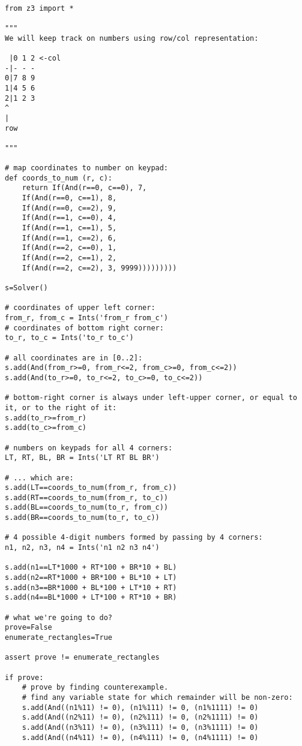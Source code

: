 \begin{lstlisting}[style=custompy]

from z3 import *

"""
We will keep track on numbers using row/col representation:

 |0 1 2 <-col
-|- - -
0|7 8 9
1|4 5 6
2|1 2 3
^
|
row

"""

# map coordinates to number on keypad:
def coords_to_num (r, c):
    return If(And(r==0, c==0), 7,
    If(And(r==0, c==1), 8,
    If(And(r==0, c==2), 9,
    If(And(r==1, c==0), 4,
    If(And(r==1, c==1), 5,
    If(And(r==1, c==2), 6,
    If(And(r==2, c==0), 1,
    If(And(r==2, c==1), 2,
    If(And(r==2, c==2), 3, 9999)))))))))

s=Solver()

# coordinates of upper left corner:
from_r, from_c = Ints('from_r from_c')
# coordinates of bottom right corner:
to_r, to_c = Ints('to_r to_c')

# all coordinates are in [0..2]:
s.add(And(from_r>=0, from_r<=2, from_c>=0, from_c<=2))
s.add(And(to_r>=0, to_r<=2, to_c>=0, to_c<=2))

# bottom-right corner is always under left-upper corner, or equal to it, or to the right of it:
s.add(to_r>=from_r)
s.add(to_c>=from_c)

# numbers on keypads for all 4 corners:
LT, RT, BL, BR = Ints('LT RT BL BR')

# ... which are:
s.add(LT==coords_to_num(from_r, from_c))
s.add(RT==coords_to_num(from_r, to_c))
s.add(BL==coords_to_num(to_r, from_c))
s.add(BR==coords_to_num(to_r, to_c))

# 4 possible 4-digit numbers formed by passing by 4 corners:
n1, n2, n3, n4 = Ints('n1 n2 n3 n4')

s.add(n1==LT*1000 + RT*100 + BR*10 + BL)
s.add(n2==RT*1000 + BR*100 + BL*10 + LT)
s.add(n3==BR*1000 + BL*100 + LT*10 + RT)
s.add(n4==BL*1000 + LT*100 + RT*10 + BR)

# what we're going to do?
prove=False
enumerate_rectangles=True

assert prove != enumerate_rectangles

if prove:
    # prove by finding counterexample.
    # find any variable state for which remainder will be non-zero:
    s.add(And((n1%11) != 0), (n1%111) != 0, (n1%1111) != 0)
    s.add(And((n2%11) != 0), (n2%111) != 0, (n2%1111) != 0)
    s.add(And((n3%11) != 0), (n3%111) != 0, (n3%1111) != 0)
    s.add(And((n4%11) != 0), (n4%111) != 0, (n4%1111) != 0)


\end{lstlisting}
